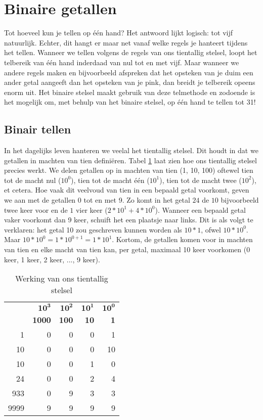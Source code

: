 \documentclass[10pt,a4paper,titlepage]{article}
\newcommand{\1}{\'{e}\'{e}n}
\begin{document}
\section*{Binaire getallen}
Tot hoeveel kun je tellen op \'{e}\'{e}n hand? Het antwoord lijkt logisch: tot vijf natuurlijk. Echter, dit hangt er maar net vanaf welke regels je hanteert tijdens het tellen. Wanneer we tellen volgens de regels van ons tientallig stelsel, loopt het telbereik van \'{e}\'{e}n hand inderdaad van nul tot en met vijf. Maar wanneer we andere regels maken en bijvoorbeeld afspreken dat het opsteken van je duim een ander getal aangeeft dan het opsteken van je pink, dan breidt je telbereik opeens enorm uit. Het binaire stelsel maakt gebruik van deze telmethode en zodoende is het mogelijk om, met behulp van het binaire stelsel, op \'{e}\'{e}n hand te tellen tot 31!

\subsection*{Binair tellen}
In het dagelijks leven hanteren we veelal het tientallig stelsel. Dit houdt in dat we getallen in machten van tien defini\"{e}ren. Tabel \ref{tab:tienstelsel} laat zien hoe ons tientallig stelsel precies werkt. We delen getallen op in machten van tien (1, 10, 100) oftewel tien tot de macht nul ($10^0$), tien tot de macht \'{e}\'{e}n ($10^1$), tien tot de macht twee ($10^2$), et cetera. Hoe vaak dit veelvoud van tien in een bepaald getal voorkomt, geven we aan met de getallen 0 tot en met 9. Zo komt in het getal $24$ de $10$ bijvoorbeeld twee keer voor en de $1$ vier keer ($2 * 10^1 + 4 * 10^0$). Wanneer een bepaald getal vaker voorkomt dan 9 keer, schuift het een plaatsje naar links. Dit is als volgt te verklaren: het getal 10 zou geschreven kunnen worden als $10 * 1$, ofwel $10 * 10^0$. Maar $10 * 10^0 = 1*10^{0+1} = 1*10^1$. Kortom, de getallen komen voor in machten van tien en elke macht van tien kan, per getal, maximaal 10 keer voorkomen (0 keer, 1 keer, 2 keer, ..., 9 keer).


\begin{table}[h!]
\caption{Werking van ons tientallig stelsel}
\begin{tabular}{rrrrr}
    & $\mathbf{10^3}$   & $\mathbf{10^2}$   & $\mathbf{10^1}$   & $\mathbf{10^0}$\\ 
    & \textbf{1000}     & \textbf{100}      & \textbf{10    }       & \textbf{1}\\ \hline
1   & 0                 &   0               &   0               & 1\\
{\color{red}10} &{\color{red}0} &{\color{red}0} &   {\color{red}0} & {\color{red}10}\\
10  &   0               &   0               & 1                 & 0\\
24  &   0               &   0               & 2                 & 4\\
933 &   0               & 9                 & 3                 & 3\\
9999& 9                 & 9                 & 9                 & 9\\
\end{tabular}
\label{tab:tienstelsel}
\end{table}
\end{document}
